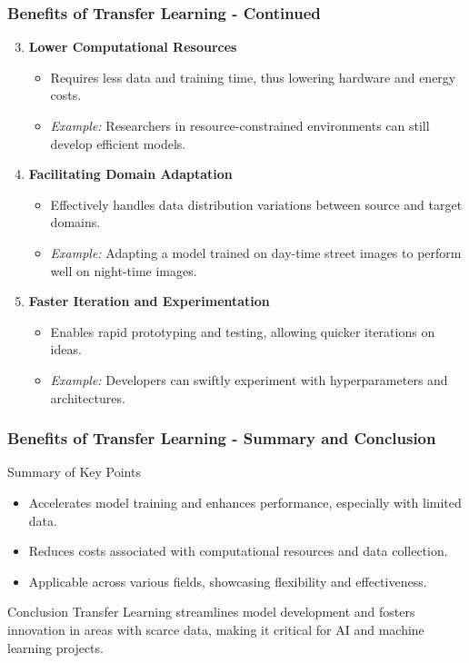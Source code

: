 \documentclass[aspectratio=169]{beamer}
\begin{document}
\begin{frame}[fragile]
    \frametitle{Benefits of Transfer Learning - Continued}
    \begin{enumerate}
        \setcounter{enumi}{2} %
        \item \textbf{Lower Computational Resources}
            \begin{itemize}
                \item Requires less data and training time, thus lowering hardware and energy costs.
                \item \textit{Example:} Researchers in resource-constrained environments can still develop efficient models.
            \end{itemize}

        \item \textbf{Facilitating Domain Adaptation}
            \begin{itemize}
                \item Effectively handles data distribution variations between source and target domains.
                \item \textit{Example:} Adapting a model trained on day-time street images to perform well on night-time images.
            \end{itemize}

        \item \textbf{Faster Iteration and Experimentation}
            \begin{itemize}
                \item Enables rapid prototyping and testing, allowing quicker iterations on ideas.
                \item \textit{Example:} Developers can swiftly experiment with hyperparameters and architectures.
            \end{itemize}
    \end{enumerate}
\end{frame}

\begin{frame}[fragile]
    \frametitle{Benefits of Transfer Learning - Summary and Conclusion}
    \begin{block}{Summary of Key Points}
        \begin{itemize}
            \item Accelerates model training and enhances performance, especially with limited data.
            \item Reduces costs associated with computational resources and data collection.
            \item Applicable across various fields, showcasing flexibility and effectiveness.
        \end{itemize}
    \end{block}

    \begin{block}{Conclusion}
        Transfer Learning streamlines model development and fosters innovation in areas with scarce data, making it critical for AI and machine learning projects.
    \end{block}
\end{frame}
\end{document}
